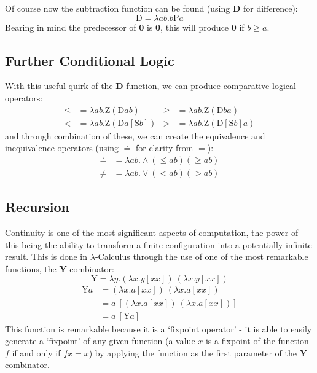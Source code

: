 \documentclass[Master.tex]{subfiles}
\begin{document}
Of course now the subtraction function can be found (using \textbf{D} for difference):
\begin{equation*}
\bm{\mathrm{D}} = \lambda ab.b\bm{\mathrm{P}}a
\end{equation*}
Bearing in mind the predecessor of \textbf{0} is \textbf{0}, this will produce \textbf{0} if $b\geq a$.
\subsection{Further Conditional Logic}

With this useful quirk of the \textbf{D} function, we can produce comparative logical operators:
\begin{equation*}
\begin{aligned}
\bm{\leq} &= \lambda ab.\bm{\mathrm{Z}}(\bm{\mathrm{D}}ab)
  & %
\bm{\geq} &= \lambda ab.\bm{\mathrm{Z}}(\bm{\mathrm{D}}ba)
  \\
\bm{<} &= \lambda ab.\bm{\mathrm{Z}}(\bm{\mathrm{D}}a[\bm{\mathrm{S}}b])
  &
\bm{>} &= \lambda ab.\bm{\mathrm{Z}}(\bm{\mathrm{D}}[\bm{\mathrm{S}}b]a)
\end{aligned}
\end{equation*}
and through combination of these, we can create the equivalence and inequivalence operators (using $\bm{\doteq}$ for clarity from $=$):
\begin{equation*}
\begin{aligned}
\bm{\doteq} &= \lambda ab.\wedge(\bm{\leq}ab)(\bm{\geq}ab)\\
\bm{\neq} &= \lambda ab.\vee(\bm{<}ab)(\bm{>}ab)
\end{aligned}
\end{equation*}
\subsection{Recursion}

Continuity is one of the most significant aspects of computation, the power of this being the ability to transform a finite configuration into a potentially infinite result. This is done in $\lambda$-Calculus through the use of one of the most remarkable functions, the \textbf{Y} combinator:
\cite{rojas2015lambdatutorial}
\begin{equation*}
\bm{\mathrm{Y}} = \lambda y.(\lambda x.y[xx])\ (\lambda x.y[xx])
\end{equation*}
\begin{equation*}
\begin{aligned}
\bm{\mathrm{Y}}a &= (\lambda x.a[xx])\ (\lambda x.a[xx])\\
&= a\ [(\lambda x.a[xx])\ (\lambda x.a[xx])]\\
&= a\ [\bm{\mathrm{Y}}a]
\end{aligned}
\end{equation*}
This function is remarkable because it is a `fixpoint operator' - it is able to easily generate a `fixpoint' of any given function (a value $x$ is a fixpoint of the function $f$ if and only if $fx = x$) by applying the function as the first parameter of the \textbf{Y} combinator.
\end{document}
